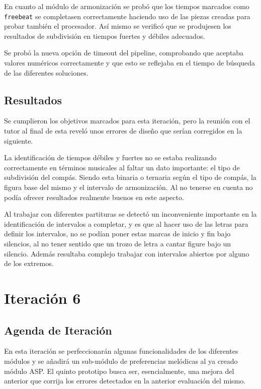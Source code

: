 En cuanto al módulo de armonización se probó que los tiempos marcados como \texttt{freebeat} se completasen correctamente haciendo uso de las piezas creadas para probar también el procesador. Así mismo se verificó que se produjesen los resultados de subdivisión en tiempos fuertes y débiles adecuados.

Se probó la nueva opción de timeout del pipeline, comprobando que aceptaba valores numéricos correctamente y que esto se reflejaba en el tiempo de búsqueda de las diferentes soluciones. 

\subsection{Resultados}
\label{subsec:fifth_iteration_result}
Se cumplieron los objetivos marcados para esta iteración, pero la reunión con el tutor al final de esta reveló unos errores de diseño que serían corregidos en la siguiente.

La identificación de tiempos débiles y fuertes no se estaba realizando correctamente en términos musicales al faltar un dato importante: el tipo de subdivisión del compás. Siendo esta binaria o ternaria según el tipo de compás, la figura base del mismo y el intervalo de armonización. Al no tenerse en cuenta no podía ofrecer resultados realmente buenos en este aspecto.

Al trabajar con diferentes partituras se detectó un inconveniente importante en la identificación de intervalos a completar, y es que al hacer uso de las letras para definir los intervalos, no se podían poner estas marcas de inicio y fin bajo silencios, al no tener sentido que un trozo de letra a cantar figure bajo un silencio. Además resultaba complejo trabajar con intervalos abiertos por alguno de los extremos.

\section{Iteración 6}
\label{sec:sixth_iteration}
\subsection{Agenda de Iteración}
\label{subsec:sixth_iteration_backlog}
 En esta iteración se perfeccionarán algunas funcionalidades de los diferentes módulos y se añadirá un sub-módulo de preferencias melódicas al ya creado módulo ASP. El quinto prototipo busca ser, esencialmente, una mejora del anterior que corrija los errores detectados en la anterior evaluación del mismo.


